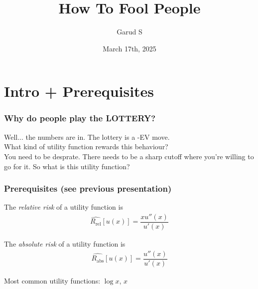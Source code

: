 \documentclass{beamer}
\title{How To Fool People}
\author{Garud S}
\date{March 17th, 2025}
\begin{document}
\frame{\titlepage}
\section{Intro + Prerequisites}
        \begin{frame}
            \frametitle{Why do people play the LOTTERY?}
            Well... the numbers are in. The lottery is a -EV move. \\ \pause
            What kind of utility function rewards this behaviour? \\ \pause
            You need to be desprate. There needs to be a sharp cutoff where you're willing to go for it. So what is this utility function?
        \end{frame}
        \begin{frame}
            \frametitle{Prerequisites (see previous presentation)}
            \begin{definition}
                The \textit{relative risk} of a utility function is
                \begin{align*}
                    \hat{R_{\text{rel}}}[u(x)] = \dfrac{xu''(x)}{u'(x)}
                \end{align*}
            \end{definition} \pause
                \begin{definition}
                    The \textit{absolute risk} of a utility function is
                    \begin{align*}
                        \hat{R_{\text{abs}}}[u(x)] = \dfrac{u''(x)}{u'(x)}
                    \end{align*}
                \end{definition}
                \pause Most common utility functions: $\log x$, $x$
        \end{frame}
\end{document}

